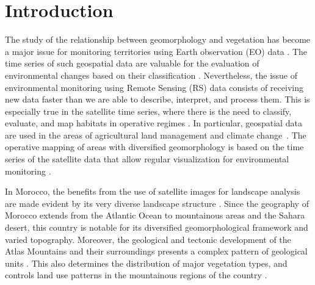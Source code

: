 \documentclass[geomatics,article,accept,pdftex,oneauthor]{Definitions/mdpi}
\begin{document}
\section{Introduction}

The study of the relationship between geomorphology and vegetation has become a major issue for monitoring territories using Earth observation (EO) data \cite{Corenblit,Muir,Pu,Cary01091990}. The time series of such geospatial data are valuable for the evaluation of environmental changes based on their classification \cite{rs15225374,w17010068,app15010338}. Nevertheless, the issue of environmental monitoring using Remote Sensing (RS) data consists of receiving new data faster than we are able to describe, interpret, and process them. This is especially true in the satellite time series, where there is the need to classify, evaluate, and map habitats in operative regimes \cite{rs15225413,rs15225408,rs15225415}. In particular, geospatial data are used in the areas of agricultural land management and climate \mbox{change \cite{Ahmadian03052016,Lemenkova202412,IMTIAZ2024109172}}. The operative mapping of areas with diversified geomorphology is based on the time series of the satellite data that allow regular visualization for environmental monitoring \cite{JOHANSSON01011978,rs9121306}.  

In Morocco, the benefits from the use of satellite images for landscape analysis are made evident by its very diverse landscape structure \cite{Sahrane13122022,Marco04032021,Aouraghe01032010}. Since the geography of Morocco extends from the Atlantic Ocean to mountainous areas and the Sahara desert, this country is notable for its diversified geomorphological framework and varied topography. Moreover, the geological and tectonic development of the Atlas Mountains and their surroundings presents a complex pattern of geological units \cite{Benvenuti31122024,Ouallali03072020,Khalloufi01032010}. This also determines the distribution of major vegetation types, and controls land use patterns in the mountainous regions of the country \cite{ALIELOMAIRI2024101321}. 
\end{document}
